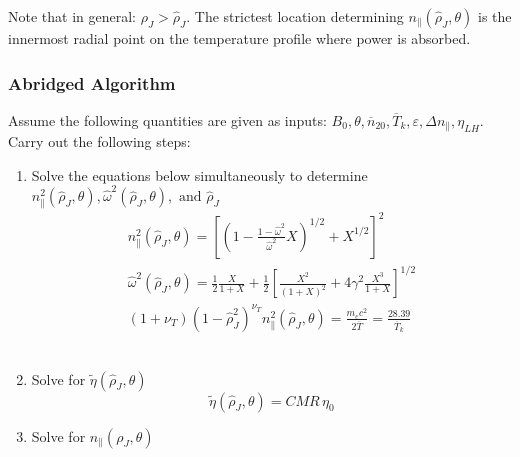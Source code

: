 Note that in general: $\rho_J > \hat \rho_J$. The strictest location determining $n_\parallel(\hat \rho_J, \theta)$ is the innermost radial point on the temperature profile where power is absorbed.

\subsubsection{Abridged Algorithm}

Assume the following quantities are given as inputs: $B _ { 0 } , \theta , \overline { n } _ { 20 } , \overline { T } _ { k } , \varepsilon , \Delta n _ { \| } , \eta _ { L H }$. Carry out the following steps:

\begin{enumerate}
	\item Solve the equations below simultaneously to determine $n _ { \| } ^ { 2 } \left( \hat { \rho } _ { J } , \theta \right) , \hat { \omega } ^ { 2 } \left( \hat { \rho } _ { J } , \theta \right) , \text { and } \hat { \rho } _ { J }$ \\
\begin{equation}
	\begin{array} { l } { n _ { \| } ^ { 2 } \left( \hat { \rho } _ { J } , \theta \right) = \left[ \left( 1 - \frac { 1 - \hat { \omega } ^ { 2 } } { \hat { \omega } ^ { 2 } } X \right) ^ { 1 / 2 } + X ^ { 1 / 2 } \right] ^ { 2 } } \\ { \hat { \omega } ^ { 2 } \left( \hat { \rho } _ { J } , \theta \right) = \frac { 1 } { 2 } \frac { X } { 1 + X } + \frac { 1 } { 2 } \left[ \frac { X ^ { 2 } } { ( 1 + X ) ^ { 2 } } + 4 \gamma ^ { 2 } \frac { X ^ { 3 } } { 1 + X } \right] ^ { 1 / 2 } } \\ { \left( 1 + \nu _ { T } \right) \left( 1 - \hat { \rho } _ { J } ^ { 2 } \right) ^ { \nu _ { T } } n _ { \| } ^ { 2 } \left( \hat { \rho } _ { J } , \theta \right) = \frac { m _ { e } c ^ { 2 } } { 2 \overline { T } } = \frac { 28.39 } { \overline { T } _ { k } } } \end{array}
\end{equation} ~
	\item Solve for $\tilde { \eta } \left( \hat { \rho } _ { J } , \theta \right)$
	\begin{equation}
		\label{eq:lhcd_7}
		\tilde { \eta } \left( \hat { \rho } _ { J } , \theta \right) = C M R \, \eta _ { 0 }
	\end{equation}
	\item Solve for $n _ { \| } \left( \rho _ { J } , \theta \right)$
	\begin{equation}

\end{equation}
\end{enumerate}
